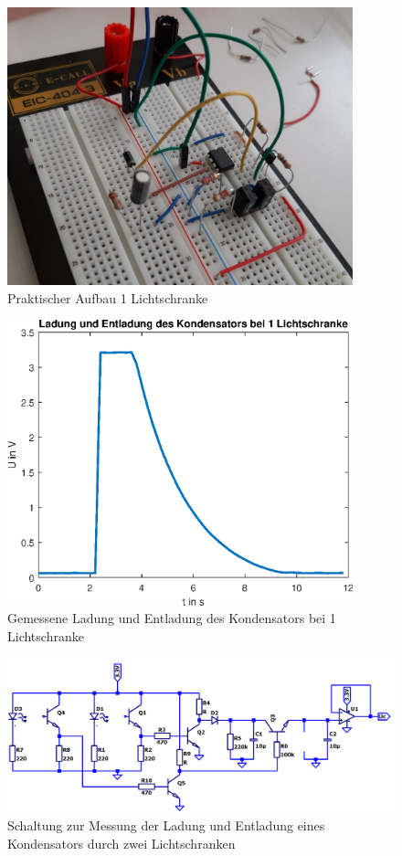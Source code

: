 \newpage

\begin{figure}[htb]
    \includegraphics[width=10cm]{./res/Kondensator_Lichtschranke_1}
    \caption{Praktischer Aufbau 1 Lichtschranke}
    \label{fig:KondensatorLadungLichtschrankeAufbau}
\end{figure}

\begin{figure}[htb]
    \includegraphics[width=10cm]{./res/Kondensator_1_Lichtschranke_Messung}
    \caption{Gemessene Ladung und Entladung des Kondensators bei 1 Lichtschranke}
    \label{fig:KondensatorLadungEntladungMess}
\end{figure}

\newpage

\begin{figure}[htb]
    \includegraphics[width=14cm]{./res/Lichtschranke_2_Spice}
    \caption{Schaltung zur Messung der Ladung und Entladung eines Kondensators durch zwei Lichtschranken}
    \label{fig:KondensatorLadungLichtschranke2}
\end{figure}

